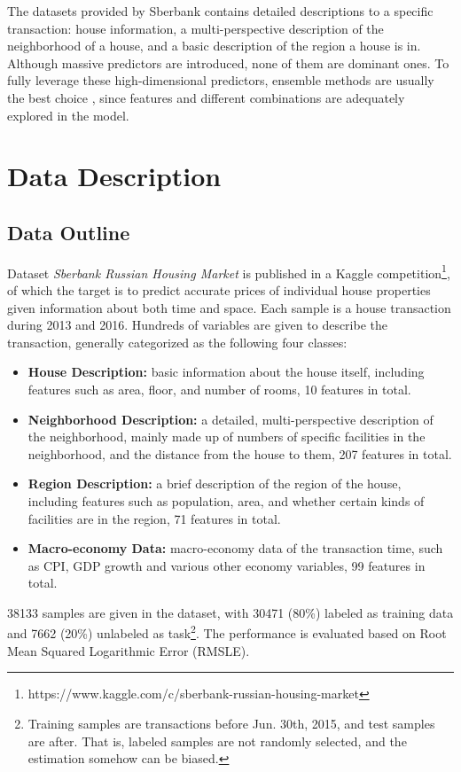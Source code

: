 \documentclass{article}
\begin{document}
The datasets provided by Sberbank contains detailed descriptions to a specific transaction: house information, a multi-perspective description of the neighborhood of a house, and a basic description of the region a house is in. Although massive predictors are introduced, none of them are dominant ones. To fully leverage these  high-dimensional predictors, ensemble methods are usually  the best choice , since features and different combinations are adequately explored in the model.

\section{Data Description}

\subsection{Data Outline}

Dataset \textit{Sberbank Russian Housing Market} is published in a Kaggle competition\footnote
{https://www.kaggle.com/c/sberbank-russian-housing-market}, of which the target is to predict accurate prices of individual house properties given information about both time and space. Each sample is a house transaction during 2013 and 2016. Hundreds of variables are given to describe the transaction, generally categorized as the following four classes:

\begin{itemize}
\item \textbf{House Description:} basic information about the house itself, including features such as  area, floor, and number of rooms, 10 features in total.
\item \textbf{Neighborhood Description:} a detailed, multi-perspective description of the neighborhood, mainly made up of numbers of specific facilities in the neighborhood, and the distance from the house to them, 207 features in total.
\item \textbf{Region Description:} a brief description of the region of the house, including features such as population, area, and whether certain kinds of facilities are in the region, 71 features in total.
\item \textbf{Macro-economy Data:} macro-economy data of the transaction time, such as CPI, GDP growth and various other economy variables, 99 features in total.
\end{itemize}

38133 samples are given in the dataset, with 30471 (80\%) labeled as training data and 7662 (20\%) unlabeled as task\footnote{Training samples are transactions before Jun. 30th, 2015, and test samples are after. That is, labeled samples are not randomly selected, and the estimation somehow can be biased.}. The performance is evaluated based on Root Mean Squared Logarithmic Error (RMSLE).
\end{document}

